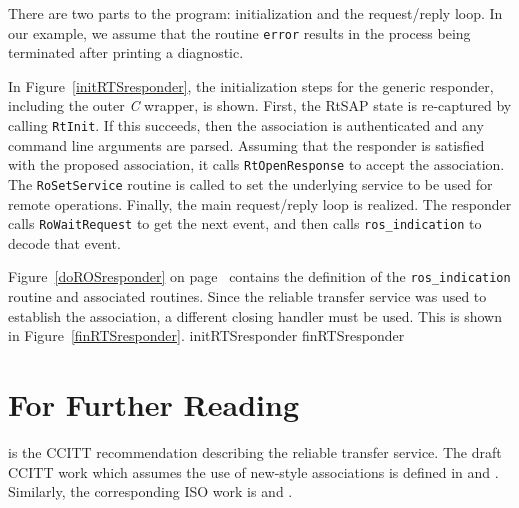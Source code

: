 There are two parts to the program:
initialization and the request/reply loop.
In our example,
we assume that the routine \verb"error" results in the process being
terminated after printing a diagnostic.

In Figure~\ref{initRTSresponder},
the initialization steps for the generic responder,
including the outer {\em C\/} wrapper,
is shown.
First, the RtSAP state is re-captured by calling \verb"RtInit".
If this succeeds,
then the association is authenticated and any command line arguments
are parsed.
Assuming that the responder is satisfied with the proposed association,
it calls \verb"RtOpenResponse" to accept the association.
The \verb"RoSetService" routine is called to set the underlying service to be
used for remote operations.
Finally,
the main request/reply loop is realized.
The responder calls \verb"RoWaitRequest" to get the next event,
and then calls \verb"ros_indication" to decode that event.

Figure~\ref{doROSresponder} on page~\pageref{doROSresponder}
contains the definition of the
\verb"ros_indication" routine and associated routines.
Since the reliable transfer service was used to establish the association,
a different closing handler must be used.
This is shown in Figure~\ref{finRTSresponder}.
{\let\small=\scriptsize			%
\clearpage
{}%
	{initRTSresponder}
\clearpage
{}%
	{finRTSresponder}}

\section	{For Further Reading}
\cite{MHS.RTS} is the CCITT recommendation describing the reliable transfer
service.
The draft CCITT work which assumes the use of new-style associations is
defined in \cite{CCITT.RTS.Service} and \cite{CCITT.RTS.Protocol}.
Similarly,
the corresponding ISO work is
\cite{ISO.RTS.Service} and \cite{ISO.RTS.Protocol}.


